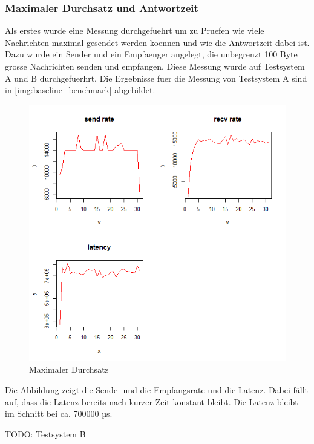 \subsubsection{Maximaler Durchsatz und Antwortzeit}
Als erstes  wurde eine Messung durchgefuehrt um zu Pruefen wie viele Nachrichten maximal gesendet werden koennen und wie die Antwortzeit dabei ist. Dazu wurde ein Sender und ein Empfaenger angelegt, die unbegrenzt 100 Byte grosse Nachrichten senden und empfangen. Diese Messung wurde auf Testsystem A und B durchgefuerhrt. Die Ergebnisse fuer die Messung von Testsystem A sind in \autoref{img:baseline_benchmark} abgebildet. 
\begin{figure}
\center
  \includegraphics[width=1\textwidth]{images/baseline.png}
  \caption{Maximaler Durchsatz}
  \label{img:baseline_benchmark}
\end{figure}
Die Abbildung zeigt die Sende- und die Empfangsrate und die Latenz. Dabei fällt auf, dass die Latenz bereits nach kurzer Zeit konstant bleibt. Die Latenz bleibt im Schnitt bei ca. 700000 µs.

TODO: Testsystem B

